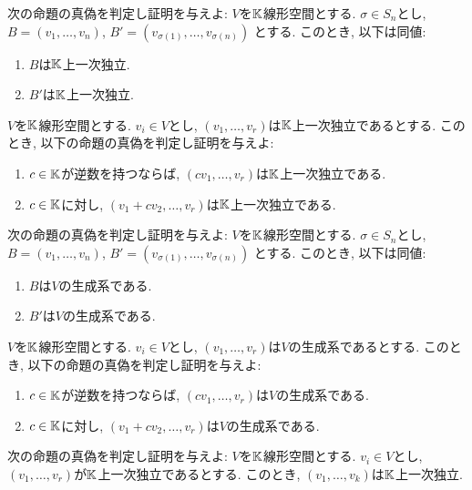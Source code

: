 \begin{quiz}
  次の命題の真偽を判定し証明を与えよ:
  $V$を$\mathbb{K}$線形空間とする.
  $\sigma\in S_n$とし,
  $B=(v_1,\ldots,v_n)$,
  $B'=(v_{\sigma(1)},\ldots,v_{\sigma(n)})$
  とする.
  このとき, 以下は同値:
  \begin{enumerate}
  \item
    $B$は$\mathbb{K}$上一次独立.
  \item
    $B'$は$\mathbb{K}$上一次独立.
  \end{enumerate}
\end{quiz}
\begin{quiz}
  $V$を$\mathbb{K}$線形空間とする.
  $v_i\in V$とし,
  $(v_1,\ldots, v_r)$は$\mathbb{K}$上一次独立であるとする.
  このとき,
  以下の命題の真偽を判定し証明を与えよ:
  \begin{enumerate}
  \item
    $c\in\mathbb{K}$が逆数を持つならば,
    $(cv_1,\ldots, v_r)$は$\mathbb{K}$上一次独立である.
  \item
    $c\in\mathbb{K}$に対し,
    $(v_1+cv_2,\ldots, v_r)$は$\mathbb{K}$上一次独立である.
  \end{enumerate}
\end{quiz}


\begin{quiz}
  次の命題の真偽を判定し証明を与えよ:
  $V$を$\mathbb{K}$線形空間とする.
  $\sigma\in S_n$とし,
  $B=(v_1,\ldots,v_n)$,
  $B'=(v_{\sigma(1)},\ldots,v_{\sigma(n)})$
  とする.
  このとき, 以下は同値:
  \begin{enumerate}
  \item
    $B$は$V$の生成系である.
  \item
    $B'$は$V$の生成系である.
  \end{enumerate}
\end{quiz}

\begin{quiz}
  $V$を$\mathbb{K}$線形空間とする.
  $v_i\in V$とし,
  $(v_1,\ldots, v_r)$は$V$の生成系であるとする.
  このとき,
  以下の命題の真偽を判定し証明を与えよ:
  \begin{enumerate}
  \item
    $c\in\mathbb{K}$が逆数を持つならば,
    $(cv_1,\ldots, v_r)$は$V$の生成系である.
  \item
    $c\in\mathbb{K}$に対し,
    $(v_1+cv_2,\ldots, v_r)$は$V$の生成系である.
  \end{enumerate}
\end{quiz}


\begin{quiz}
  次の命題の真偽を判定し証明を与えよ:
  $V$を$\mathbb{K}$線形空間とする.
  $v_i\in V$とし,
  $(v_1,\ldots, v_r)$が$\mathbb{K}$上一次独立であるとする.
  このとき,
  $(v_{1},\ldots, v_{k})$は$\mathbb{K}$上一次独立.
\end{quiz}



